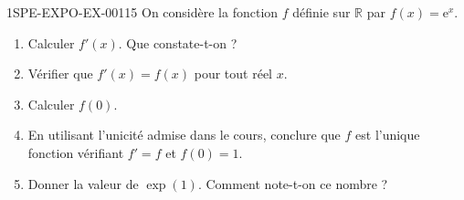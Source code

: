\begin{exercice}{1SPE-EXPO-EX-001}{1}{5}
On considère la fonction $f$ définie sur $\mathbb{R}$ par $f(x) = \mathrm{e}^x$.
\begin{enumerate}
\item Calculer $f'(x)$. Que constate-t-on ?
\item Vérifier que $f'(x) = f(x)$ pour tout réel $x$.
\item Calculer $f(0)$.
\item En utilisant l'unicité admise dans le cours, conclure que $f$ est l'unique fonction vérifiant $f' = f$ et $f(0) = 1$.
\item Donner la valeur de $\exp(1)$. Comment note-t-on ce nombre ?
\end{enumerate}
\end{exercice}
